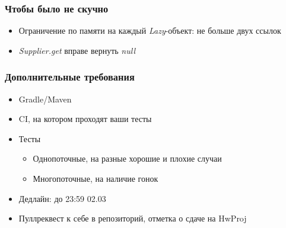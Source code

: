\documentclass[xetex,mathserif,serif]{beamer}
\begin{document}
	\begin{frame}
	\frametitle{Чтобы было не скучно}
		\begin{itemize}
			\item Ограничение по памяти на каждый \textit{Lazy}-объект: не больше двух ссылок
			\item \textit{Supplier.get} вправе вернуть \textit{null}
		\end{itemize}
	\end{frame}

	\begin{frame}
	\frametitle{Дополнительные требования}
		\begin{itemize}
			\item Gradle/Maven
			\item CI, на котором проходят ваши тесты
			\item Тесты
			\begin{itemize}
				\item Однопоточные, на разные хорошие и плохие случаи
				\item Многопоточные, на наличие гонок
			\end{itemize}
			\item Дедлайн: до 23:59 02.03
			\item Пуллреквест к себе в репозиторий, отметка о сдаче на HwProj
		\end{itemize}
	\end{frame}
\end{document}
